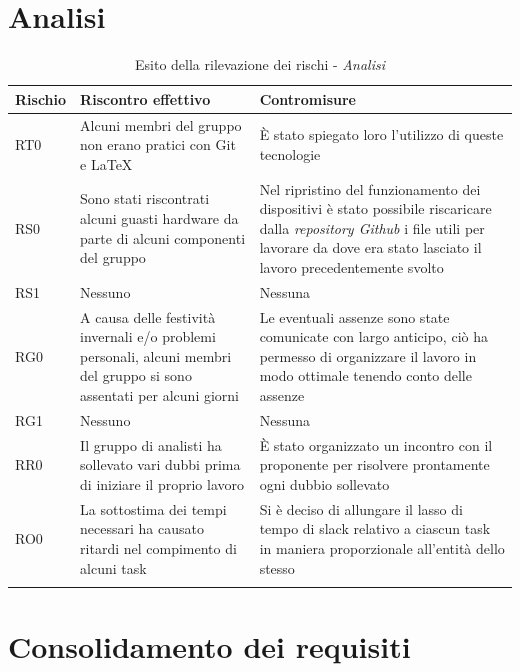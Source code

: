 \documentclass[./PianodiProgetto.tex]{subfiles}
\begin{document}
\section{Analisi}

\setlength\LTleft{-5.5mm}

\begin{longtable}{|p{15mm}|p{60mm}|p{60mm}|}
	\hline \textbf{Rischio} & \textbf{Riscontro effettivo} & \textbf{Contromisure} \\
	
	\hline RT0 & Alcuni membri del gruppo non erano pratici con Git e \LaTeX &  È stato spiegato loro l'utilizzo di queste tecnologie \\
	
	\hline RS0 & Sono stati riscontrati alcuni guasti hardware da parte di alcuni componenti del gruppo & Nel ripristino del funzionamento dei dispositivi è stato possibile riscaricare dalla \textit{repository Github} i file utili per lavorare da dove era stato lasciato il lavoro precedentemente svolto \\
	
	\hline RS1 & Nessuno & Nessuna \\
	
	\hline RG0 & A causa delle festività invernali e/o problemi personali, alcuni membri del gruppo si sono assentati per alcuni giorni & Le eventuali assenze sono state comunicate con largo anticipo, ciò ha permesso di organizzare il lavoro in modo ottimale tenendo conto delle assenze \\
	
	\hline RG1 & Nessuno & Nessuna \\
	
	\hline RR0 & Il gruppo di analisti ha sollevato vari dubbi prima di iniziare il proprio lavoro & È stato organizzato un incontro con il proponente per risolvere prontamente ogni dubbio sollevato \\
	
	\hline RO0 & La sottostima dei tempi necessari ha causato ritardi nel compimento di alcuni task & Si è deciso di allungare il lasso di tempo di slack relativo a ciascun task in maniera proporzionale all'entità dello stesso \\
	
	\hline
	\caption{Esito della rilevazione dei rischi - \textit{Analisi}}
\end{longtable}

\section{Consolidamento dei requisiti}
\end{document}
